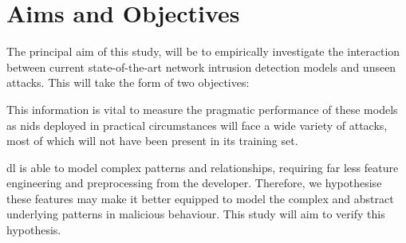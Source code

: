 \chapter{Aims and Objectives}%
\label{chp:aims}
\hypertarget{obj}{}

The principal aim of this study, will be to empirically investigate the
interaction between current state-of-the-art network intrusion detection models
and unseen attacks. This will take the form of two objectives:

\begin{center}
\end{center}

This information is vital to measure the pragmatic performance of these models
as \gls{nids} deployed in practical circumstances will face a wide variety of
attacks, most of which will not have been present in its training set.

\begin{center}
\end{center}

\gls{dl} is able to model complex patterns and relationships,
requiring far less feature engineering and preprocessing from the developer.
Therefore, we hypothesise these features may make it better equipped to model
the complex and abstract underlying patterns in malicious behaviour. This study
will aim to verify this hypothesis.
